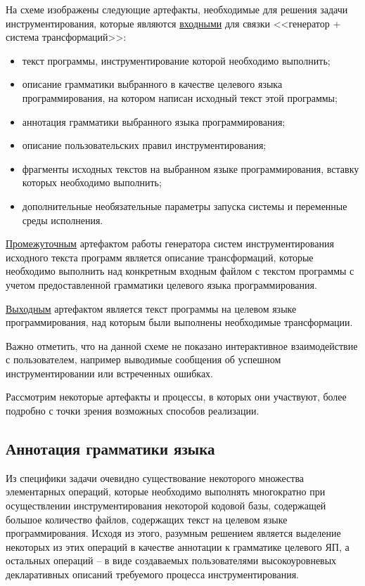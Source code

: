 На схеме изображены следующие артефакты, необходимые для решения задачи инструментирования, которые являются \underline{входными} для связки <<генератор + система трансформаций>>:
\begin{itemize}[noitemsep]
  \item текст программы, инструментирование которой необходимо выполнить;
  \item описание грамматики выбранного в качестве целевого языка программирования, на котором написан исходный текст этой программы;
  \item аннотация грамматики выбранного языка программирования;
  \item описание пользовательских правил инструментирования;
  \item фрагменты исходных текстов на выбранном языке программирования, вставку которых необходимо выполнить;
  \item дополнительные необязательные параметры запуска системы и переменные среды исполнения.
\end{itemize}

\underline{Промежуточным} артефактом работы генератора систем инструментирования исходного текста программ является описание трансформаций, которые необходимо выполнить над конкретным входным файлом с текстом программы с учетом предоставленной грамматики целевого языка программирования.

\underline{Выходным} артефактом является текст программы на целевом языке программирования, над которым были выполнены необходимые трансформации.

Важно отметить, что на данной схеме не показано интерактивное взаимодействие с пользователем, например выводимые сообщения об успешном инструментировании или встреченных ошибках.

Рассмотрим некоторые артефакты и процессы, в которых они участвуют, более подробно с точки зрения возможных способов реализации.

\subsection{Аннотация грамматики языка}

Из специфики задачи очевидно существование некоторого множества элементарных операций, которые необходимо выполнять многократно при осуществлении инструментирования некоторой кодовой базы, содержащей большое количество файлов, содержащих текст на целевом языке программирования.
Исходя из этого, разумным решением является выделение некоторых из этих операций в качестве аннотации к грамматике целевого ЯП, а остальных операций -- в виде создаваемых пользователями высокоуровневых декларативных описаний требуемого процесса инструментирования.

